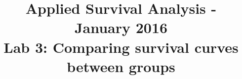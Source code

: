 \documentclass[11pt,a4paper]{article}
\begin{document}
\title{Applied Survival Analysis - January 2016\\Lab 3: Comparing survival curves between groups}
\date{\vspace{-10ex}}
\author{\vspace{-10ex}}
\maketitle

\end{document}
